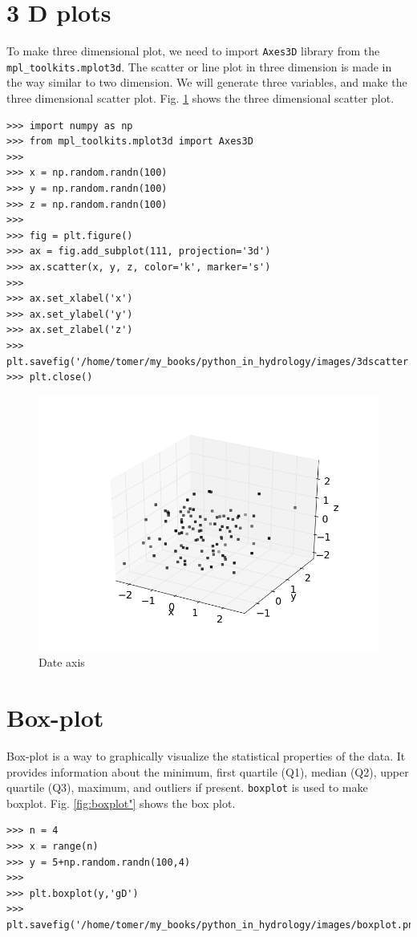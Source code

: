 \documentclass[10pt]{book}
\begin{document}
{\section{3 D plots}
To make three dimensional plot, we need to import \verb"Axes3D" library from the \verb"mpl_toolkits.mplot3d". The scatter or line plot in three dimension is made in the way similar to two dimension. We will generate three variables, and make the three dimensional scatter plot. Fig. \ref{fig:3dscatter} shows the three dimensional scatter plot. 
\beforeverb \begin{verbatim}
>>> import numpy as np
>>> from mpl_toolkits.mplot3d import Axes3D
>>> 
>>> x = np.random.randn(100)
>>> y = np.random.randn(100)
>>> z = np.random.randn(100)
>>> 
>>> fig = plt.figure()
>>> ax = fig.add_subplot(111, projection='3d')
>>> ax.scatter(x, y, z, color='k', marker='s')
>>> 
>>> ax.set_xlabel('x')
>>> ax.set_ylabel('y')
>>> ax.set_zlabel('z')
>>> plt.savefig('/home/tomer/my_books/python_in_hydrology/images/3dscatter.png')
>>> plt.close()
\end{verbatim} \afterverb
{}

\beforefig
\begin{figure}[h!]
  \centering
    \includegraphics[scale=0.5]{images/3dscatter.png}
  \caption{Date axis}
   \label{fig:3dscatter}
\end{figure}
\afterfig

\section{Box-plot}
Box-plot is a way to graphically visualize the statistical properties of the data. It provides information about the minimum, first quartile (Q1), median (Q2), upper quartile (Q3), maximum, and outliers if present. \verb"boxplot" is used to make boxplot. Fig. \ref{fig:boxplot"} shows the box plot. 
\beforeverb \begin{verbatim}
>>> n = 4
>>> x = range(n)
>>> y = 5+np.random.randn(100,4)
>>> 
>>> plt.boxplot(y,'gD')
>>> plt.savefig('/home/tomer/my_books/python_in_hydrology/images/boxplot.png')
\end{verbatim} \afterverb

}
\end{document}
